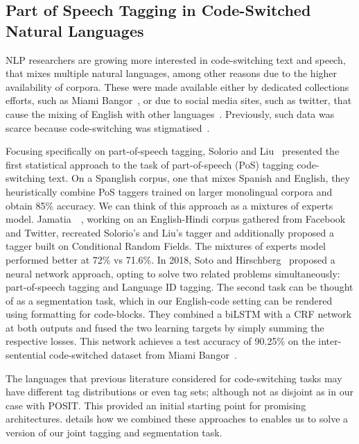 \subsection{Part of Speech Tagging in Code-Switched Natural Languages}
\label{chapter:literature:sec:posit_rel_work:nlcs}

NLP researchers are growing more interested in code-switching text and speech,
\ie that mixes multiple natural languages, among other reasons due to the higher
availability of corpora. These were made available either by dedicated
collections efforts, such as Miami Bangor~\cite{bangorTalk}, or due to social
media sites, such as twitter, that cause the mixing of English with other
languages~\cite{Vyas2014}. Previously, such data was scarce because
code-switching was stigmatised~\cite{Poplack1980}. 

Focusing specifically on part-of-speech tagging, Solorio and
Liu~\cite{Solorio2008} presented the first statistical approach to the task of
part-of-speech (PoS) tagging code-switching text. On a Spanglish corpus, one
that mixes Spanish and English, they heuristically combine PoS taggers trained
on larger monolingual corpora and obtain 85\% accuracy. We can think of this
approach as a mixtures of experts model. Jamatia~\etal~\cite{Jamatia2015},
working on an English-Hindi corpus gathered from Facebook and Twitter, recreated
Solorio's and Liu's tagger and additionally proposed a tagger built on
Conditional Random Fields. The mixtures of experts model performed better at
72\% vs 71.6\%. In 2018, Soto and Hirschberg~\cite{Soto2018} proposed a neural
network approach, opting to solve two related problems simultaneously:
part-of-speech tagging and Language ID tagging. The second task can be thought
of as a segmentation task, which in our English-code setting can be rendered
using formatting for code-blocks. They combined a biLSTM with a CRF network at
both outputs and fused the two learning targets by simply summing the respective
losses. This network achieves a test accuracy of 90.25\% on the inter-sentential
code-switched dataset from Miami Bangor~\cite{bangorTalk}.

The languages that previous literature considered for code-switching tasks may
have different tag distributions or even tag sets; although not as disjoint as
in our case with POSIT. This provided an initial starting point for promising
architectures.  details how we combined these approaches to
enables us to solve a version of our joint tagging and segmentation task.

